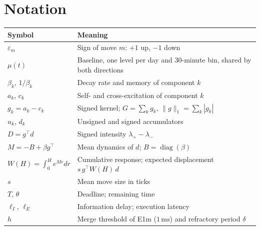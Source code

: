 \documentclass[11pt]{article}
\theoremstyle{definition}
\theoremstyle{remark}
\newcommand{\Em}{\textsf{E1m}}
\newcommand{\ms}{\,\text{ms}}
\begin{document}
\section{Notation}

\begin{center}
\small
\begin{tabularx}{\textwidth}{@{}p{3.2cm}L@{}}
\toprule
Symbol & Meaning \\
\midrule
$\varepsilon_m$ & Sign of move $m$: $+1$ up, $-1$ down \\
$\mu(t)$ & Baseline, one level per day and 30-minute bin, shared by both directions \\
$\beta_k$, $1/\beta_k$ & Decay rate and memory of component $k$ \\
$a_k$, $c_k$ & Self- and cross-excitation of component $k$ \\
$g_k = a_k - c_k$ & Signed kernel; $G = \sum_k g_k$, $\|g\|_1 = \sum_k |g_k|$ \\
$u_k$, $d_k$ & Unsigned and signed accumulators \\
$D = g^\top d$ & Signed intensity $\lambda_+ - \lambda_-$ \\
$M = -B + \beta g^\top$ & Mean dynamics of $d$; $B = \operatorname{diag}(\beta)$ \\
$W(H) = \int_0^H e^{Mr}dr$ & Cumulative response; expected displacement $s\,g^\top W(H)\,d$ \\
$s$ & Mean move size in ticks \\
$T$, $\theta$ & Deadline; remaining time \\
$\ell_I$, $\ell_E$ & Information delay; execution latency \\
$h$ & Merge threshold of \Em{} ($1\ms$) and refractory period $\delta$ \\
\bottomrule
\end{tabularx}
\end{center}
\end{document}
